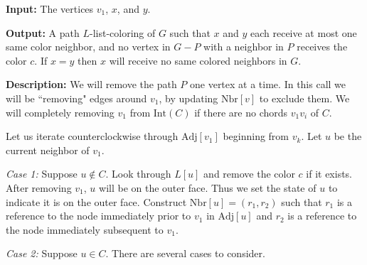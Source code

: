 \documentclass[letterpaper, 12pt]{article}
\theoremstyle{definition}
\theoremstyle{definition}
\theoremstyle{thm}
\theoremstyle{definition}
\begin{document}
\noindent\textbf{Input:} The vertices $v_1$, $x$, and $y$.

\noindent\textbf{Output:} A path $L$-list-coloring of $G$ such that $x$ and
$y$ each receive at most one same color neighbor, and no vertex in
$G-P$ with a neighbor in $P$ receives the color $c$. If $x=y$ then $x$ will
receive no same colored neighbors in $G$.

\begin{comment}
\begin{figure}
\begin{center}
\begin{tikzpicture}
  \node (c_n) [label=above left:$v_k$, fill] at (-1.5cm, 1.25cm) {};
  \node (p) [label=above:{$v_1$}] at (0cm, 2cm) {};
  \node (p_label) [draw=none, scale=0.8] at (0cm, 2cm) {};
  \node (c_1) [label=above:$v_2$] at (1.5cm, 1.25cm) {};
  \node (c_i) [label=below:$u$] at (0cm, -1cm) {};
  \node (G_0) [draw=none, fill=none] at (-0.75cm, 0.12cm) {$C_1$};
  \node (G_1) [draw=none, fill=none] at (0.7cm, 0.5cm) {$C_2$};
  
  \draw (c_i) edge [bend left] (c_n) [dashed];
  \draw (c_n) edge [bend left] (c_i) [dashed];
  \draw (c_n) edge (p);
  \draw (p) edge (c_1);
  \draw (p) edge (c_i);
  \draw (c_1) edge [bend left] (c_i) [dashed];
\end{tikzpicture}
\end{center}

\caption{The cycles $C_1$ and $C_2$.}
\end{figure}
\end{comment}

\noindent\textbf{Description:} We will remove the path $P$ one vertex at a
time. In this call we will be ``removing" edges around $v_1$, by updating
$\text{Nbr}[v]$ to exclude them. We will completely removing $v_1$ from
$\text{Int}(C)$ if there are no chords $v_1v_i$ of $C$.

Let us iterate counterclockwise through $\text{Adj}[v_1]$ beginning from $v_k$.
Let $u$ be the current neighbor of $v_1$.

\textit{Case 1:} Suppose $u\not\in C$. Look through $L[u]$ and remove the color
$c$ if it exists. After removing $v_1$, $u$ will be on the
outer face. Thus we set the state of $u$ to indicate it is
on the outer face. Construct $\text{Nbr}[u]=(r_1,r_2)$ such that
$r_1$ is a reference to the node immediately prior to $v_1$ in $\text{Adj}[u]$
and $r_2$ is a reference to the node immediately subsequent to $v_1$.

\textit{Case 2:} Suppose $u\in C$. There are several cases to consider.
\end{document}

